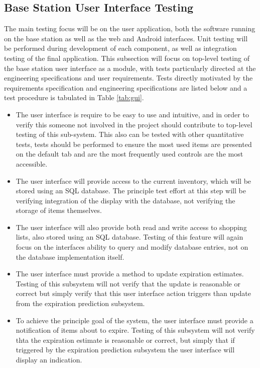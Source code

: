 \documentclass[11pt,letterpaper]{article}
\begin{document}
\subsection{Base Station User Interface Testing}
The main testing focus will be on the user application, both the software running on the base station as well as the web and Android interfaces.  Unit testing will be performed during development of each component, as well as integration testing of the final application. This subsection will focus on top-level testing of the base station user interface as a module, with tests particularly directed at the engineering specifications and user requirements. Tests directly motivated by the requirements specification and engineering specifications are listed below and a test procedure is tabulated in Table \ref{tab:gui}.
\begin{itemize}
\item The user interface is require to be easy to use and intuitive, and in order to verify this someone not involved in the project should contribute to top-level testing of this sub-system. This also can be tested with other quantitative tests, tests should be performed to ensure the most used items are presented on the default tab and are the most frequently used controls are the most accessible.
\item The user interface will provide access to the current inventory, which will be stored using an SQL database. The principle test effort at this step will be verifying integration of the display with the database, not verifying the storage of items themselves.
\item The user interface will also provide both read and write access to shopping lists, also stored using an SQL database. Testing of this feature will again focus on the interfaces ability to query and modify database entries, not on the database implementation itself.
\item The user interface must provide a method to update expiration estimates. Testing of this subsystem will not verify that the update is reasonable or correct but simply verify that this user interface action triggers than update from the expiration prediction subsystem.
\item To achieve the principle goal of the system, the user interface must provide a notification of items about to expire. Testing of this subsystem will not verify thta the expiration estimate is reasonable or correct, but simply that if triggered by the expiration prediction subsystem the user interface will display an indication.
\end{itemize}
\end{document}

